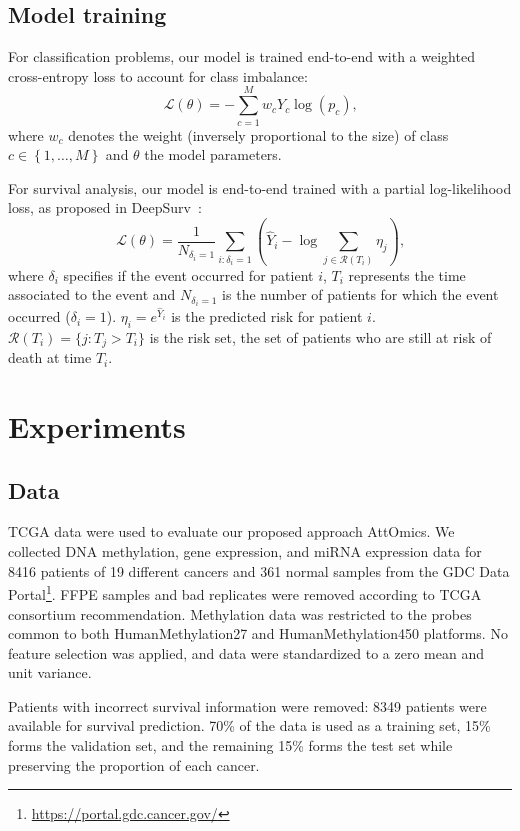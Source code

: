 \documentclass[../main.tex]{subfiles}
\begin{document}
\subsection{Model training}

For classification problems, our model is trained end-to-end with a weighted cross-entropy loss to account for class imbalance:
\[ \mathcal{L}(\theta) = - \sum_{c=1}^{M}w_c Y_c \log\left( p_c\right) \text{,}\]
where $w_c$ denotes the weight (inversely proportional to the size) of class $c \in \left\{1, \ldots,M \right\}$ and $\theta$ the model parameters.

For survival analysis, our model is end-to-end trained with a partial log-likelihood loss, as proposed in DeepSurv~\cite{katzmanDeepSurvPersonalizedTreatment2018}:
\[ \mathcal{L}(\theta) = \frac{1}{N_{\delta_i = 1}} \sum_{i:\delta_i=1} \left(\hat{Y}_i - \log \sum_{j \in \mathcal{R}(T_i)}\eta_j \right) \text{,}\]
where $\delta_i$ specifies if the event occurred for patient $i$, $T_i$ represents the time associated to the event and $N_{\delta_i = 1}$ is the number of patients for which the event occurred ($\delta_i = 1$).
$\eta_i = e^{\hat{Y}_i}$ is the predicted risk for patient $i$.
$\mathcal{R}(T_i) = \{j: T_j > T_i\}$ is the risk set, the set of patients who are still at risk of death at time $T_i$.

\section{Experiments}
\subsection{Data}

TCGA data were used to evaluate our proposed approach AttOmics.
We collected DNA methylation, gene expression, and miRNA expression data for 8416 patients of 19 different cancers and 361 normal samples from the GDC Data Portal\footnote{\url{https://portal.gdc.cancer.gov/}}.
FFPE samples and bad replicates were removed according to TCGA consortium recommendation.
Methylation data was restricted to the probes common to both HumanMethylation27 and HumanMethylation450 platforms.
No feature selection was applied, and data were standardized to a zero mean and unit variance.

Patients with incorrect survival information were removed: 8349 patients were available for survival prediction.
70\% of the data is used as a training set, 15\% forms the validation set, and the remaining 15\% forms the test set while preserving the proportion of each cancer.
\end{document}

